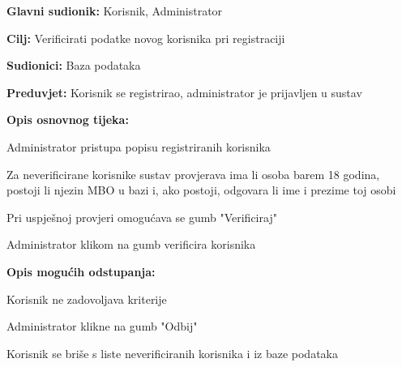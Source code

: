 					
					\noindent {}
					\begin{packed_item}
						
						\item \textbf{Glavni sudionik: }Korisnik, Administrator
						\item  \textbf{Cilj:} Verificirati podatke novog korisnika pri registraciji
						\item  \textbf{Sudionici:} Baza podataka
						\item  \textbf{Preduvjet:} Korisnik se registrirao, administrator je prijavljen u sustav
						\item  \textbf{Opis osnovnog tijeka:}
						
						\item[] \begin{packed_enum}
							
							\item Administrator pristupa popisu registriranih korisnika
							\item Za neverificirane korisnike sustav provjerava ima li osoba barem 18 godina, postoji li njezin MBO u bazi i, ako postoji, odgovara li ime i prezime toj osobi
							\item Pri uspješnoj provjeri omogućava se gumb "Verificiraj"
							\item Administrator klikom na gumb verificira korisnika
						\end{packed_enum}
						
						\item  \textbf{Opis mogućih odstupanja:}
						
						\item[] \begin{packed_item}
							
							\item[4.a] Korisnik ne zadovoljava kriterije
							\item[] \begin{packed_enum}
								
								\item Administrator klikne na gumb "Odbij"
								\item Korisnik se briše s liste neverificiranih korisnika i iz baze podataka
								
							\end{packed_enum}		
							
						\end{packed_item}
					\end{packed_item}
					
